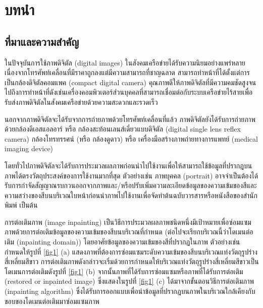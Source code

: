 \chapter{บทนำ}
\section{ที่มาและความสำคัญ}

\hspace{1cm} ในปัจจุบันการใช้ภาพดิจิตัล (digital images) ในสังคมเครือข่ายได้รับความนิยมอย่างแพร่หลาย เนื่องจากโทรศัพท์เคลื่อนที่มีราคาถูกลงแต่มีความสามารถที่ชาญฉลาด สามารถทำหน้าที่ได้ตั้งแต่การเป็นกล้องดิจิตัลคอมแพค (compact digital camera)  คุณภาพดีให้ภาพดิจิตัลที่มีความคมชัดสูงจนไปถึงการทำหน้าที่ดังเช่นเครื่องคอมพิวเตอร์ส่วนบุคคลที่สามารถเชื่อมต่อกับระบบเครือข่ายไร้สายเพื่อรับส่งภาพดิจิตัลในสังคมเครือข่ายด้วยความสะดวกและรวดเร็ว

\hspace{1cm} นอกจากภาพดิจิตัลจะได้รับจากการถ่ายภาพด้วยโทรศัพท์เคลื่อนที่แล้ว ภาพดิจิตัลยังได้รับการถ่ายภาพด้วยกล้องดีเอสแอลอาร์ หรือ กล้องสะท้อนเลนส์เดี่ยวแบบดิจิตัล (digital single lens reflex camera) กล้องโทรทรรศน์ (หรือ กล้องดูดาว) หรือ เครื่องมือสร้างภาพถ่ายทางการแพทย์ (medical imaging device) 

\hspace{1cm} โดยทั่วไปภาพดิจิตัลจะได้รับการประมวลผลภาพก่อนนำไปใช้งานเพื่อให้สามารถใช้ข้อมูลที่ปรากฎบนภาพได้ตรงวัตถุประสงค์ของการใช้งานมากที่สุด ตัวอย่างเช่น ภาพบุคคล (portrait) อาจจำเป็นต้องได้รับการกำจัดสัญญาณรบกวนออกจากภาพและ/หรือปรับเพิ่มความละเอียดข้อมูลของความเข้มของสีและความสว่างของสีบนบริเวณใบหน้าก่อนนำภาพไปใช้งานเพื่อจัดทำต้นฉบับวารสารหรือหนังสือของสำนักพิมพ์ เป็นต้น  

\hspace{1cm} การต่อเติมภาพ (image inpainting) เป็นวิธีการประมวลผลภาพชนิดหนึ่งมีเป้าหมายเพื่อซ่อมแซมภาพด้วยการต่อเติมข้อมูลของความเข้มของสีบนบริเวณที่กำหนด (ต่อไปจะเรียกบริเวณนี้ว่าโดเมนต่อเติม (inpainting domain)) โดยอาศัยข้อมูลของความเข้มของสีที่ปรากฏในภาพ ตัวอย่างเช่น 
    กำหนดให้รูปที่ \ref{fig1} (a) แสดงภาพที่ต้องการซ่อมแซมระดับความเข้มของสีบนบริเวณแท่งวัตถุรูปร่างสี่เหลี่ยมสีขาว การต่อเติมภาพดังกล่าวจะเริ่มด้วยการกำหนดให้บริเวณแท่งวัตถุรูปร่างสี่เหลี่ยมสีขาวเป็นโดเมนการต่อเติมดังรูปที่ \ref{fig1} (b) จากนั้นภาพที่ได้รับการซ่อมแซมหรือภาพที่ได้รับการต่อเติม (restored or inpainted image) ซึ่งแสดงในรูปที่ \ref{fig1} (c) ได้มาจากขั้นตอนวิธีการต่อเติมภาพ (inpainting algorithm) ซึ่งได้รับการออกแบบเพื่อนำข้อมูลที่ปรากฎบนภาพในบริเวณใกล้เคียงกับขอบของโดเมนต่อเติมมาซ่อมแซมภาพ 
    
